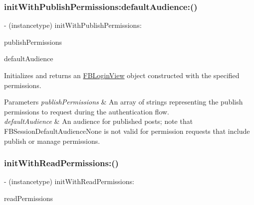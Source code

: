 \subsubsection{\texorpdfstring{init\+With\+Publish\+Permissions\+:default\+Audience\+:()}{initWithPublishPermissions:defaultAudience:()}\hspace{0.1cm}{\footnotesize\ttfamily [5/5]}}
{\footnotesize\ttfamily -\/ (instancetype) init\+With\+Publish\+Permissions\+: \begin{DoxyParamCaption}\item[{(N\+S\+Array $\ast$)}]{publish\+Permissions }\item[{defaultAudience:(F\+B\+Session\+Default\+Audience)}]{default\+Audience }\end{DoxyParamCaption}}

Initializes and returns an {\ttfamily \hyperlink{interfaceFBLoginView}{F\+B\+Login\+View}} object constructed with the specified permissions.


\begin{DoxyParams}{Parameters}
{\em publish\+Permissions} & An array of strings representing the publish permissions to request during the authentication flow.\\
\hline
{\em default\+Audience} & An audience for published posts; note that F\+B\+Session\+Default\+Audience\+None is not valid for permission requests that include publish or manage permissions. \\
\hline
\end{DoxyParams}
\mbox{\label{interfaceFBLoginView_a1a7bc3cf0ef2b11b1d3c7b6567ad937f}} 
\subsubsection{\texorpdfstring{init\+With\+Read\+Permissions\+:()}{initWithReadPermissions:()}\hspace{0.1cm}{\footnotesize\ttfamily [1/5]}}
{\footnotesize\ttfamily -\/ (instancetype) init\+With\+Read\+Permissions\+: \begin{DoxyParamCaption}\item[{(N\+S\+Array $\ast$)}]{read\+Permissions }\end{DoxyParamCaption}}

